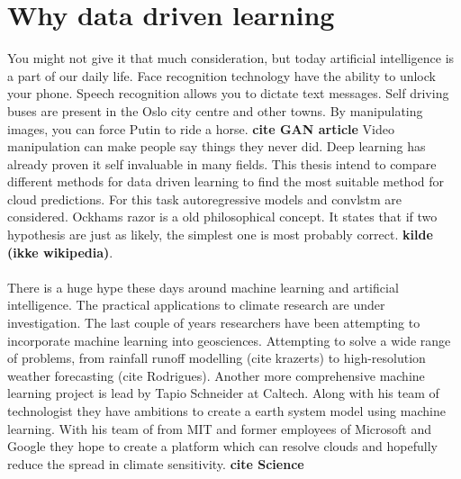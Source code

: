 \section{Why data driven learning} \label{sec:intro_deep_learning}
You might not give it that much consideration, but today artificial intelligence is a part of our daily life. Face recognition technology have the ability to unlock your phone. Speech recognition allows you to dictate text messages. Self driving buses are present in the Oslo city centre and other towns. By manipulating images, you can force Putin to ride a horse. \textbf{cite GAN article} Video manipulation can make people say things they never did. Deep learning has already proven it self invaluable in many fields. This thesis intend to compare different methods for data driven learning to find the most suitable method for cloud predictions. For this task autoregressive models and \acrfull{convlstm} are considered. 
Ockhams razor is a old philosophical concept. It states that if two hypothesis are just as likely, the simplest one is most probably correct. \textbf{kilde (ikke wikipedia)}.
\\ \\
There is a huge hype these days around machine learning and artificial intelligence.
The practical applications to climate research are under investigation. The last couple of years researchers have been attempting to incorporate machine learning into geosciences. Attempting to solve a wide range of problems, from rainfall runoff modelling (cite krazerts) to  high-resolution weather forecasting (cite Rodrigues).
Another more comprehensive machine learning project is lead by Tapio Schneider at Caltech. Along with his team of technologist they have ambitions to create a earth system model using machine learning. With his team of from MIT and former employees of Microsoft and Google they hope to create a platform which can resolve clouds and hopefully reduce the spread in climate sensitivity. \textbf{cite Science}
